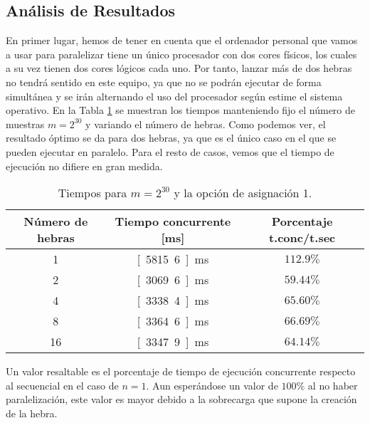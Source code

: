 \documentclass[12pt]{article}
\begin{document}
\subsection{Análisis de Resultados}

En primer lugar, hemos de tener en cuenta que el ordenador personal que vamos
a usar para paralelizar tiene un único procesador con dos cores físicos, los cuales a su vez tienen
dos cores lógicos cada uno. Por tanto, lanzar más de dos hebras no tendrá sentido en este equipo,
ya que no se podrán ejecutar de forma simultánea y se irán alternando el uso del procesador
según estime el sistema operativo. En la Tabla \ref{tab:dist_num_hebras} se muestran los tiempos
manteniendo fijo el número de muestras $m=2^{30}$ y variando el número de hebras.
Como podemos ver, el resultado óptimo se da para dos hebras, ya que es el único caso en el que se pueden ejecutar en paralelo.
Para el resto de casos, vemos que el tiempo de ejecución no difiere en gran medida.
\begin{table}
    \centering
    \begin{tabular}{|c|c|c|}
        \hline
        \textbf{Número de hebras} & \textbf{Tiempo concurrente [ms]} & \textbf{Porcentaje t.conc/t.sec} \\
        \hline
        1 & \unit[5815.6]{ms} & $112.9\%$ \\
        2 & \unit[3069.6]{ms} & $59.44\%$ \\
        4 & \unit[3338.4]{ms} & $65.60\%$ \\
        8 & \unit[3364.6]{ms} & $66.69\%$ \\
        16 & \unit[3347.9]{ms} & $64.14\%$ \\
        \hline
    \end{tabular}
    \caption{Tiempos para $m=2^{30}$ y la opción de asignación 1.}
    \label{tab:dist_num_hebras}
\end{table}
Un valor resaltable es el porcentaje de tiempo de ejecución concurrente respecto al secuencial en el caso de $n=1$.
Aun esperándose un valor de $100\%$ al no haber paralelización, este valor es mayor debido a la sobrecarga que supone la creación de la hebra.
\end{document}
